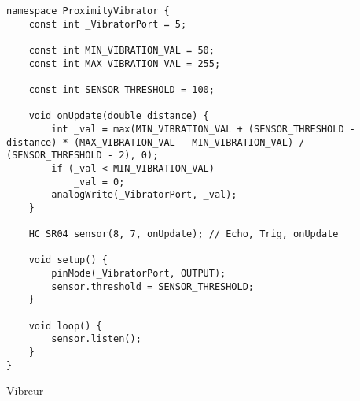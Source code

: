 \begin{code}
\begin{verbatim}
namespace ProximityVibrator {
    const int _VibratorPort = 5;

    const int MIN_VIBRATION_VAL = 50;
    const int MAX_VIBRATION_VAL = 255;

    const int SENSOR_THRESHOLD = 100;

    void onUpdate(double distance) {
        int _val = max(MIN_VIBRATION_VAL + (SENSOR_THRESHOLD - distance) * (MAX_VIBRATION_VAL - MIN_VIBRATION_VAL) / (SENSOR_THRESHOLD - 2), 0);
        if (_val < MIN_VIBRATION_VAL)
            _val = 0;
        analogWrite(_VibratorPort, _val);
    }

    HC_SR04 sensor(8, 7, onUpdate); // Echo, Trig, onUpdate

    void setup() {
        pinMode(_VibratorPort, OUTPUT);
        sensor.threshold = SENSOR_THRESHOLD;
    }

    void loop() {
        sensor.listen();
    }
}
\end{verbatim}
\caption{Vibreur}
\end{code}